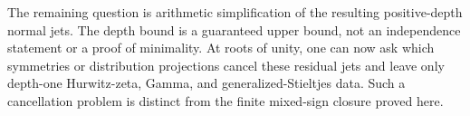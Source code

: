 The remaining question is arithmetic simplification of the resulting
positive-depth normal jets.  The depth bound is a guaranteed upper
bound, not an independence statement or a proof of minimality.
At roots of unity, one can now ask which symmetries or distribution
projections cancel these residual jets and leave only depth-one
Hurwitz-zeta, Gamma, and generalized-Stieltjes data.  Such a
cancellation problem is distinct from the finite mixed-sign closure
proved here.
